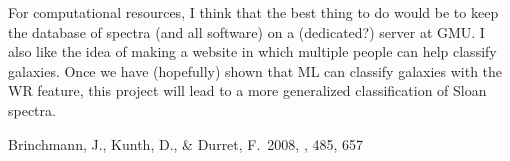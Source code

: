 \documentclass[iop,apj]{emulateapj}
\begin{document}
For computational resources, I think that the best thing to do would be to keep the database of spectra (and all software) on a (dedicated?) server at GMU.  I also like the idea of making a website in which multiple people can help classify galaxies. Once we have (hopefully) shown that ML can classify galaxies with the WR feature, this project will lead to a more generalized classification of Sloan spectra.


\begin{thebibliography}{}



 Brinchmann, J., Kunth, D., \& Durret, F.\ 2008, \aap, 485, 657

\end{thebibliography}
\end{document}
